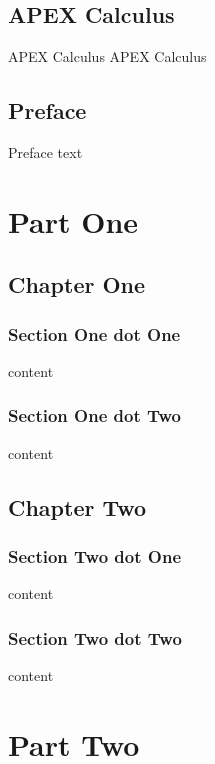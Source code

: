 \documentclass[openany]{book}
\begin{document}
\iflatexml
\label{lxApexTOC}
\tableofcontents
\chapter*{APEX Calculus}
APEX Calculus
\else
APEX Calculus
\tableofcontents
\fi

\chapter*{Preface}
Preface text

\part{Part One}

\chapter{Chapter One}

\section{Section One dot One}

content

\section{Section One dot Two}

content

\chapter{Chapter Two}

\section{Section Two dot One}

content

\section{Section Two dot Two}

content

\part{Part Two}
\end{document}
